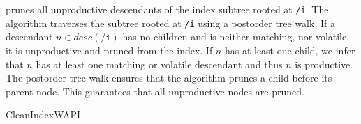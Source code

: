 \documentclass[abstracton,12pt]{scrartcl}
\theoremstyle{definition}
\begin{document}
 prunes all
unproductive descendants of the index subtree rooted at \texttt{/i}. The algorithm traverses
the subtree rooted at \texttt{/i} using a postorder tree walk. If a descendant $n \in
desc(\texttt{/i})$ has no children and is neither matching, nor
volatile, it is unproductive and pruned from the index. If $n$ has at least
one child, we infer
that $n$ has at least one matching or volatile descendant and thus $n$ is
productive. The postorder tree walk ensures
that the algorithm prunes a child before its parent node. This guarantees that
all unproductive nodes are pruned.

\begin{algorithm}
  \caption{CleanIndexWAPI}
  \DontPrintSemicolon
  \label{algo:periodic_gc_wapi}
\end{algorithm}

\vspace{-1cm}
\end{document}

